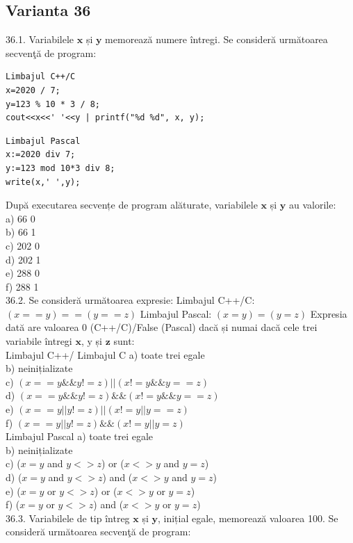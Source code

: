 \begin{itemize}
\begin{enumerate}
\section*{Varianta 36}

36.1. Variabilele $\mathbf{x}$ și $\mathbf{y}$ memorează numere întregi. Se consideră următoarea secvenţă de program:
\begin{verbatim}
Limbajul C++/C 
x=2020 / 7;
y=123 % 10 * 3 / 8;
cout<<x<<' '<<y | printf("%d %d", x, y);
\end{verbatim}
\begin{verbatim}
Limbajul Pascal
x:=2020 div 7;
y:=123 mod 10*3 div 8;
write(x,' ',y);
\end{verbatim}
După executarea secvențe de program alăturate, variabilele $\mathbf{x}$ și $\mathbf{y}$ au valorile:
\\
a) 66 0
\\
b) 66 1
\\
c) 202 0
\\
d) 202 1
\\
e) 288 0
\\
f) 288 1
\\
36.2. Se consideră următoarea expresie:
Limbajul C++/C: $(x==y)==(y==z)$
Limbajul Pascal: $(x=y)=(y=z)$
Expresia dată are valoarea 0 (C++/C)/False (Pascal) dacă și numai dacă cele trei variabile întregi $\mathbf{x}$, $\mathrm{y}$ și $\mathbf{z}$ sunt:
\\
Limbajul C++/ Limbajul C
a) toate trei egale
\\
b) neinițializate
\\
c) $(x==y \&\& y!=z) || (x!=y \&\& y==z)$
\\
d) $(x==y \&\& y!=z) \&\& (x!=y \&\& y==z)$
\\
e) $(x==y || y!=z) || (x!=y || y==z)$
\\
f) $(x==y || y!=z) \&\& (x!=y || y=z)$
\\
Limbajul Pascal
a) toate trei egale
\\
b) neinițializate
\\
c) ($x=y$ and $y<>z$) or ($x<>y$ and $y=z$)
\\
d) ($x=y$ and $y<>z$) and ($x<>y$ and $y=z$)
\\
e) ($x=y$ or $y<>z$) or ($x<>y$ or $y=z$)
\\
f) ($x=y$ or $y<>z$) and ($x<>y$ or $y=z$)
\\
36.3. Variabilele de tip întreg $\mathbf{x}$ și $\mathbf{y}$, inițial egale, memorează valoarea 100. Se consideră următoarea secvenţă de program:
\begin{verbatim}

\end{verbatim}
\end{enumerate}
\end{itemize}
